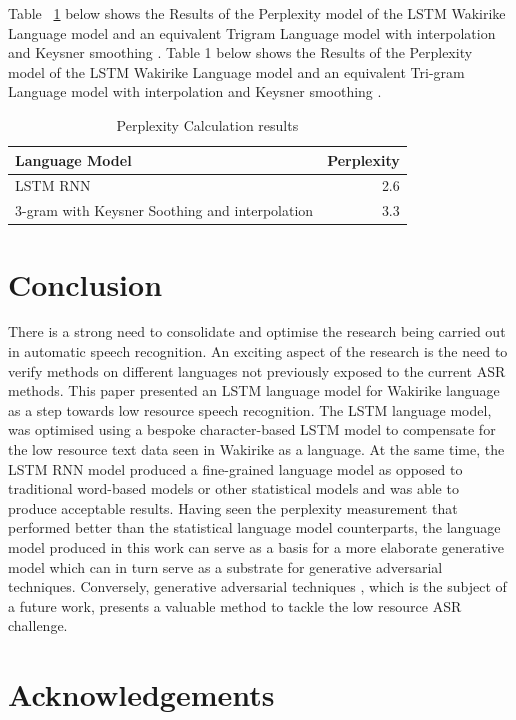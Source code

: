 \documentclass[a4paper]{article}
\begin{document}
Table ~\ref{tab:example} below shows the Results of the Perplexity model of the LSTM Wakirike Language model and an equivalent Trigram Language model with interpolation and Keysner smoothing \cite{chen1996empirical}.
Table 1 below shows the Results of the Perplexity model of the LSTM Wakirike Language model and an equivalent Tri-gram Language model with interpolation and Keysner smoothing \cite{chen1996empirical}.
\begin{table}
  \caption{Perplexity Calculation results}
  \label{tab:example}
\begin{tabular}{lr}
\toprule
Language Model & Perplexity\\
\midrule
LSTM RNN & 2.6\\
3-gram with Keysner Soothing and interpolation & 3.3\\
\bottomrule
\end{tabular}
\end{table}

\section{Conclusion}
There is a strong need to consolidate and optimise the research being carried out in automatic speech recognition.  An exciting aspect of the research is the need to verify methods on different languages not previously exposed to the current ASR methods.  This paper presented an LSTM language model for Wakirike language as a step towards low resource speech recognition.  The LSTM language model, was optimised using a bespoke character-based LSTM model to compensate for the low resource text data seen in Wakirike as a language. At the same time, the LSTM RNN model produced a fine-grained language model as opposed to traditional word-based models or other statistical models and was able to produce acceptable results. Having seen the perplexity measurement that performed better than the statistical language model counterparts, the language model produced in this work can serve as a basis for a more elaborate generative model which can in turn serve as a substrate for generative adversarial techniques. Conversely, generative adversarial techniques \cite{goodfellow2014generative}, which is the subject of a future work, presents a valuable method to tackle the low resource ASR challenge.

\section{Acknowledgements}
\end{document}
